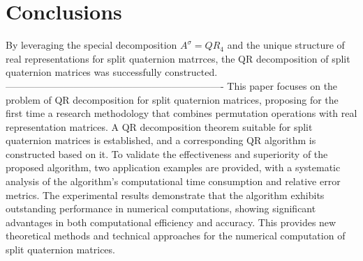 \documentclass[12pt]{article}
\numberwithin{equation}{section} %
\begin{document}
\section{\textbf{Conclusions}}
By leveraging the special decomposition $A^\sigma = QR_4$ and the unique structure of  real representations for split quaternion matrrces, the QR decomposition of split quaternion matrices was successfully constructed.
-------------------------------------------------------------------
This paper focuses on the problem of QR decomposition for split quaternion matrices, proposing for the first time a research methodology that combines permutation operations with real representation matrices. A QR decomposition theorem suitable for split quaternion matrices is established, and a corresponding QR algorithm is constructed based on it. To validate the effectiveness and superiority of the proposed algorithm, two application examples are provided, with a systematic analysis of the algorithm's computational time consumption and relative error metrics. The experimental results demonstrate that the algorithm exhibits outstanding performance in numerical computations, showing significant advantages in both computational efficiency and accuracy. This provides new theoretical methods and technical approaches for the numerical computation of split quaternion matrices.
\fi
\end{document}
